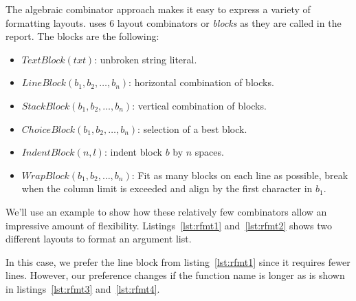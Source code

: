 The algebraic combinator approach makes it easy to express a variety of formatting layouts.
\rfmt{} uses 6 layout combinators or \emph{blocks} as they are called in the report.
The blocks are the following:
\begin{itemize}
  \item $TextBlock(txt)$: unbroken string literal.
  \item $LineBlock(b_1, b_2, \ldots, b_n)$: horizontal combination of blocks.
  \item $StackBlock(b_1, b_2, \ldots, b_n)$: vertical combination of blocks.
  \item $ChoiceBlock(b_1, b_2, \ldots, b_n)$: selection of a best block.
  \item $IndentBlock(n, l)$: indent block $b$ by $n$ spaces.
  \item $WrapBlock(b_1, b_2, \ldots, b_n)$:
    Fit as many blocks on each line as possible, break when the column limit is exceeded and align by the first character in $b_1$.
\end{itemize}
We'll use an example to show how these relatively few combinators allow an impressive amount of flexibility.
Listings~\ref{lst:rfmt1} and~\ref{lst:rfmt2} shows two different layouts to format an argument list.

\begin{minipage}{.45\textwidth}
  
\end{minipage}
\hfil
\begin{minipage}{.45\textwidth}
  
\end{minipage}

In this case, we prefer the line block from listing~\ref{lst:rfmt1} since it requires fewer lines.
However, our preference changes if the function name is longer as is shown in listings~\ref{lst:rfmt3} and~\ref{lst:rfmt4}.

\begin{minipage}{.45\textwidth}
  
\end{minipage}
\hfil
\begin{minipage}{.45\textwidth}
  
\end{minipage}

